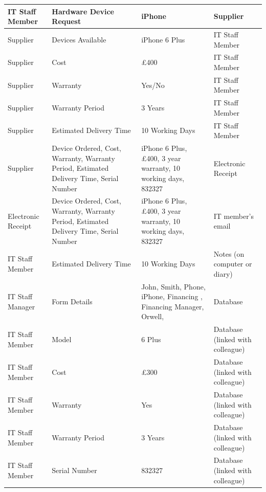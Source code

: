 \begin{longtable}{|p{3cm}|p{3cm}|p{3cm}|p{3cm}|}
IT Staff Member 	&Hardware Device Request & iPhone & Supplier 												\\ \hline
Supplier & Devices Available & iPhone 6 Plus & IT Staff Member \\ \hline
Supplier & Cost & £400 &IT Staff Member \\ \hline
Supplier &Warranty & Yes/No & IT Staff Member \\ \hline
Supplier &Warranty Period & 3 Years & IT Staff Member \\ \hline
Supplier & Estimated Delivery Time & 10 Working Days & IT Staff Member \\ \hline
Supplier & Device Ordered, Cost, Warranty, Warranty Period, Estimated Delivery Time, Serial Number & iPhone 6 Plus, £400, 3 year warranty, 10 working days, 832327 & Electronic Receipt \\ \hline
Electronic Receipt  & Device Ordered, Cost, Warranty, Warranty Period, Estimated Delivery Time, Serial Number & iPhone 6 Plus, £400, 3 year warranty, 10 working days, 832327 & IT member's email \\ \hline
IT Staff Member & Estimated Delivery Time & 10 Working Days & Notes (on computer or diary) \\ \hline
IT Staff Manager                      & Form Details   & John, Smith, Phone, iPhone, Financing , Financing Manager, Orwell, & Database                                  \\ \hline
IT Staff Member                             & Model                              & 6 Plus                                             & Database (linked with colleague)                                      \\ \hline
IT Staff Member                       & Cost                              & £300                                               & Database (linked with colleague)          \\ \hline
IT Staff Member                       & Warranty                           & Yes                                        & Database (linked with colleague)          \\ \hline
IT Staff Member                       & Warranty Period                           & 3 Years                                            & Database (linked with colleague)          \\ \hline
IT Staff Member                       & Serial Number                      & 832327                                             & Database (linked with colleague)          \\ \hline

\end{longtable}
